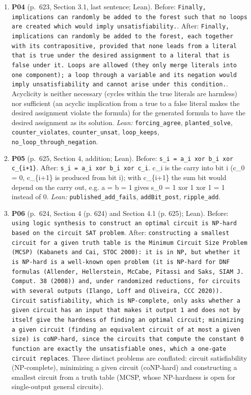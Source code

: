 \documentclass[9pt,twocolumn]{article}
\begin{document}
\begin{enumerate}[label=]
\item \textbf{P04} (p.~623, Section 3.1, last sentence; Lean). Before: \texttt{Finally, implications can randomly be added to the forest such that no loops are created which would imply unsatisfiability.}. After: \texttt{Finally, implications can randomly be added to the forest, each together with its contrapositive, provided that none leads from a literal that is true under the desired assignment to a literal that is false under it. Loops are allowed (they only merge literals into one component); a loop through a variable and its negation would imply unsatisfiability and cannot arise under this condition.}. Acyclicity is neither necessary (cycles within the true literals are harmless) nor sufficient (an acyclic implication from a true to a false literal makes the desired assignment violate the formula) for the generated formula to have the desired assignment as its solution. \emph{Lean:} \texttt{forcing\_agree}, \texttt{planted\_solve}, \texttt{counter\_violates}, \texttt{counter\_unsat}, \texttt{loop\_keeps}, \texttt{no\_loop\_through\_negation}. 
\item \textbf{P05} (p.~625, Section 4, addition; Lean). Before: \texttt{s\_i = a\_i xor b\_i xor c\_\{i+1\}}. After: \texttt{s\_i = a\_i xor b\_i xor c\_i}. c\_i is the carry into bit i (c\_0 = 0, c\_\{i+1\} is produced from bit i); with c\_\{i+1\} the sum bit would depend on the carry out, e.g. a = b = 1 gives s\_0 = 1 xor 1 xor 1 = 1 instead of 0. \emph{Lean:} \texttt{published\_add\_fails}, \texttt{addBit\_post}, \texttt{ripple\_add}. 
\item \textbf{P06} (p.~624, Section 4 (p. 624) and Section 4.1 (p. 625); Lean). Before: \texttt{using logic synthesis to construct an optimal circuit is NP-hard based on the circuit SAT problem}. After: \texttt{constructing a smallest circuit for a given truth table is the Minimum Circuit Size Problem (MCSP) (Kabanets and Cai, STOC 2000): it is in NP, but whether it is NP-hard is a well-known open problem (it is NP-hard for DNF formulas (Allender, Hellerstein, McCabe, Pitassi and Saks, SIAM J. Comput. 38 (2008)) and, under randomized reductions, for circuits with several outputs (Ilango, Loff and Oliveira, CCC 2020)). Circuit satisfiability, which is NP-complete, only asks whether a given circuit has an input that makes it output 1 and does not by itself give the hardness of finding an optimal circuit; minimizing a given circuit (finding an equivalent circuit of at most a given size) is coNP-hard, since the circuits that compute the constant 0 function are exactly the unsatisfiable ones, which a one-gate circuit replaces}. Three distinct problems are conflated: circuit satisfiability (NP-complete), minimizing a given circuit (coNP-hard) and constructing a smallest circuit from a truth table (MCSP, whose NP-hardness is open for single-output general circuits). 

\end{enumerate}
\end{document}
